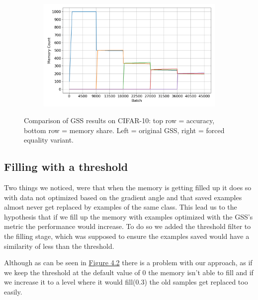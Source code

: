 \documentclass[oneside]{ctuthesis}
\begin{document}
\begin{figure}[t]
\begin{subfigure}[t]{0.48\linewidth}
        \label{fig:gss-cifar10-mem-share}
    \end{subfigure}
    \hfill
    \begin{subfigure}[t]{0.48\linewidth}
        \centering
        \includegraphics[width=\linewidth]{figures/DISJOINT2_GSS1k_B1_FORCED_EQUALITY_memory.png}
        \label{fig:gss-cifar10-fe-mem-share}
    \end{subfigure}

    \caption{Comparison of GSS results on CIFAR-10: top row = accuracy, bottom row = memory share. Left = original GSS, right = forced equality variant.}
    \label{fig:gss-cifar10-grid}
\end{figure}

\subsection{Filling with a threshold}
Two things we noticed, were that when the memory is getting filled up it does so with data not optimized based on the gradient angle and that saved examples almost never get replaced by examples of the same class. This lead us to the hypothesis that if we fill up the memory with examples optimized with the GSS's metric the performance would increase. To do so we added the threshold filter to the filling stage, which was supposed to ensure the examples saved would have a similarity of less than the threshold.

Although as can be seen in \hyperref[fig:gss-fill-threshold-comparison]{Figure 4.2} there is a problem with our approach, as if we keep the threshold at the default value of 0 the memory isn't able to fill and if we increase it to a level where it would fill(0.3) the old samples get replaced too easily. 
\end{document}
